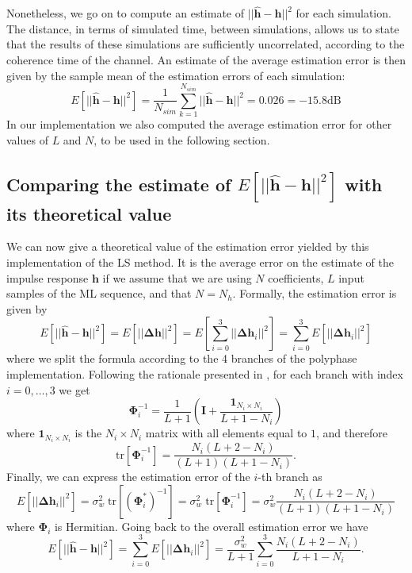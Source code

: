 \documentclass[10pt]{article}
\newcommand{\dB} {\mathrm{dB}}
\newcommand{\tr} {\mathrm{tr}}
\begin{document}
Nonetheless, we go on to compute an estimate of $||\mathbf{\hat{h}}-\mathbf{h}||^2$ for each simulation. The distance, in terms of simulated time, between simulations, allows us to state that the results of these simulations are sufficiently uncorrelated, according to the coherence time of the channel. An estimate of the average estimation error is then given by the sample mean of the estimation errors of each simulation:
\begin{equation}
E[||\mathbf{\hat{h}}-\mathbf{h}||^2] = \frac{1}{N_{sim}}\sum_{k=1}^{N_{sim}} ||\mathbf{\hat{h}}-\mathbf{h}||^2 = 0.026 = -15.8 \dB
\end{equation}
In our implementation we also computed the average estimation error for other values of $L$ and $N$, to be used in the following section.


\subsection*{Comparing the estimate of $E[||\mathbf{\hat{h}}-\mathbf{h}||^2]$ with its theoretical value}

We can now give a theoretical value of the estimation error yielded by this implementation of the LS method. It is the average error on the estimate of the impulse response $\mathbf{h}$ if we assume that we are using $N$ coefficients, $L$ input samples of the ML sequence, and that $N=N_h$. Formally, the estimation error is given by
\begin{equation}
	E[||\mathbf{\hat{h}}-\mathbf{h}||^2] = E[||\mathbf{\Delta h}||^2] = E\left[\sum_{i=0}^{3} ||\mathbf{\Delta h}_i||^2\right] = \sum_{i=0}^{3} E[||\mathbf{\Delta h}_i||^2]
\end{equation}
where we split the formula according to the 4 branches of the polyphase implementation. Following the rationale presented in \cite{bc}, for each branch with index $i=0,\ldots,3$ we get
\begin{equation}
	\mathbf{\Phi}_i^{-1} = \frac{1}{L+1} \left( \mathbf{I} + \frac{\mathbf{1}_{N_i \times N_i}}{L+1-N_i} \right)
\end{equation}
where $\mathbf{1}_{N_i \times N_i}$ is the $N_i \times N_i$ matrix with all elements equal to $1$, and therefore
\begin{equation}
	\tr [\mathbf{\Phi}_i^{-1}] = \frac{N_i(L+2-N_i)}{(L+1)(L+1-N_i)}.
\end{equation}
Finally, we can express the estimation error of the $i$-th branch as
\begin{equation}
	E[||\mathbf{\Delta h}_i||^2] = \sigma_w^2 \; \tr [(\mathbf{\Phi}_i^*)^{-1}] = \sigma_w^2 \; \tr [\mathbf{\Phi}_i^{-1}] = \sigma_w^2 \frac{N_i(L+2-N_i)}{(L+1)(L+1-N_i)}
\end{equation}
where $\mathbf{\Phi}_i$ is Hermitian. Going back to the overall estimation error we have
\begin{equation}\label{deltahtheo}
	E[||\mathbf{\hat{h}}-\mathbf{h}||^2] = \sum_{i=0}^{3} E[||\mathbf{\Delta h}_i||^2] = \frac{\sigma_w^2}{L+1} \sum_{i=0}^{3} \frac{N_i (L+2-N_i)}{L+1-N_i}.
\end{equation}
\end{document}

